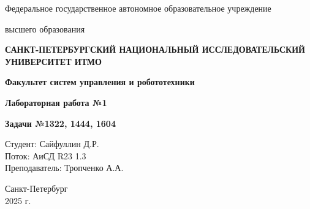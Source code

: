 \documentclass[a4paper,12pt]{article}
\begin{document}
\begin{titlepage}
    \centering
    {\large Федеральное государственное автономное образовательное учреждение\par}
    {\large высшего образования\par}
    {\bfseries САНКТ-ПЕТЕРБУРГСКИЙ НАЦИОНАЛЬНЫЙ ИССЛЕДОВАТЕЛЬСКИЙ УНИВЕРСИТЕТ ИТМО\par}
    {\bfseries Факультет систем управления и робототехники\par}
    \vfill
    {\Large \bfseries Лабораторная работа №1\par}
    {\Large \bfseries Задачи №1322, 1444, 1604\par}
    \vfill
    
    \begin{flushright}
        Студент: Сайфуллин Д.Р. \\
        Поток: АиСД R23 1.3 \\
        Преподаватель: Тропченко А.А.
    \end{flushright}
    \vfill
    Санкт-Петербург \\
    2025 г.
\end{titlepage}
\end{document}
